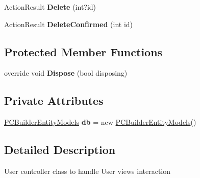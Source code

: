 \begin{DoxyCompactItemize}
\item 
Action\+Result {\bfseries Delete} (int?id)\hypertarget{class_p_c_builder_m_v_c_1_1_controllers_1_1_user_controller_afeff41f0a91f9d77d4ec0e81471bd649}{}\label{class_p_c_builder_m_v_c_1_1_controllers_1_1_user_controller_afeff41f0a91f9d77d4ec0e81471bd649}

\item 
Action\+Result {\bfseries Delete\+Confirmed} (int id)\hypertarget{class_p_c_builder_m_v_c_1_1_controllers_1_1_user_controller_a6fc23363eff6bad1a8f2f08143d89b60}{}\label{class_p_c_builder_m_v_c_1_1_controllers_1_1_user_controller_a6fc23363eff6bad1a8f2f08143d89b60}

\end{DoxyCompactItemize}
\subsection*{Protected Member Functions}
\begin{DoxyCompactItemize}
\item 
override void {\bfseries Dispose} (bool disposing)\hypertarget{class_p_c_builder_m_v_c_1_1_controllers_1_1_user_controller_af8e537824aef9d778ef7158795528d66}{}\label{class_p_c_builder_m_v_c_1_1_controllers_1_1_user_controller_af8e537824aef9d778ef7158795528d66}

\end{DoxyCompactItemize}
\subsection*{Private Attributes}
\begin{DoxyCompactItemize}
\item 
\hyperlink{class_p_c_builder_m_v_c_1_1_models_1_1_p_c_builder_entity_models}{P\+C\+Builder\+Entity\+Models} {\bfseries db} = new \hyperlink{class_p_c_builder_m_v_c_1_1_models_1_1_p_c_builder_entity_models}{P\+C\+Builder\+Entity\+Models}()\hypertarget{class_p_c_builder_m_v_c_1_1_controllers_1_1_user_controller_a7dd8061d33d8b9a9ca57bf574302a53f}{}\label{class_p_c_builder_m_v_c_1_1_controllers_1_1_user_controller_a7dd8061d33d8b9a9ca57bf574302a53f}

\end{DoxyCompactItemize}


\subsection{Detailed Description}
User controller class to handle User views interaction 

